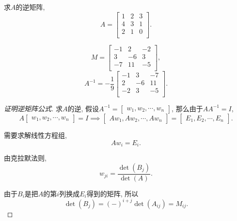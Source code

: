 \begin{example}
    求$A$的逆矩阵, 
    \begin{equation}
      A = \begin{bmatrix}
       1 & 2 & 3\\
       4 & 3 & 1\\
       2 & 1 & 0\\
      \end{bmatrix}.
    \end{equation}

    \begin{equation}
      M = \begin{bmatrix}
       -1 & 2 & -2\\
       3 & -6 & 3\\
       -7 & 11 & -5\\
      \end{bmatrix},
    \end{equation}
    \begin{equation}
      A^{-1} = - \frac{1}{9} \begin{bmatrix}
       -1 & 3 & -7\\
       2 & -6 & 11\\
       -2 & 3 & -5\\
      \end{bmatrix}.
    \end{equation}
\end{example}

\begin{proof}[证明逆矩阵公式]
    求$A$的逆, 假设$A^{-1} = \begin{bmatrix} w_1, w_2, \cdots, w_n \end{bmatrix}$, 那么由于$A A^{-1} = I$,
    \begin{equation}
      A \begin{bmatrix} w_1, w_2, \cdots, w_n \end{bmatrix} = I
      \implies 
      \begin{bmatrix} Aw_1, Aw_2, \cdots, Aw_n \end{bmatrix} = \begin{bmatrix} E_1, E_2, \cdots, E_n \end{bmatrix}.
    \end{equation}
    
    需要求解线性方程组, 
    \begin{equation}
      A w_i = E_i.
    \end{equation}

    由克拉默法则,
    \begin{equation}
      w_{ji} = \frac{\det \left( B_j \right)}{\det \left( A \right)}.
    \end{equation}

    由于$B_i$是把$A$的第$i$列换成$E_i$得到的矩阵, 所以
    \begin{equation}
      \det \left( B_j \right) = \left( - \right) ^{i + j} \det \left( A_{i j} \right) = M_{ij}.
    \end{equation}
\end{proof}